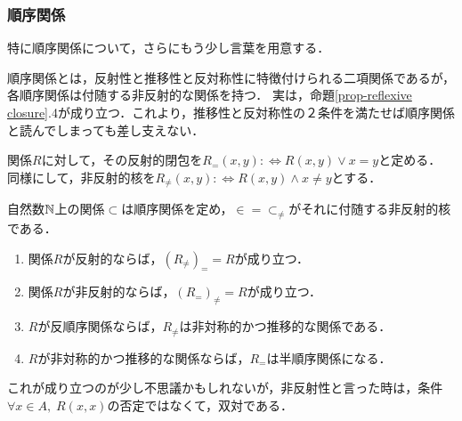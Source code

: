 \documentclass[uplatex, dvipdfmx]{jsreport}
\begin{document}
\subsubsection*{順序関係}

特に順序関係について，さらにもう少し言葉を用意する．

順序関係とは，反射性と推移性と反対称性に特徴付けられる二項関係であるが，各順序関係は付随する非反射的な関係を持つ．
実は，命題\ref{prop-reflexive closure}.4が成り立つ．これより，推移性と反対称性の２条件を満たせば順序関係と読んでしまっても差し支えない．
\begin{notation}
    関係$R$に対して，その反射的閉包を$R_=(x,y):\Leftrightarrow R(x,y)\lor x=y$と定める．
    同様にして，非反射的核を$R_\ne(x,y):\Leftrightarrow R(x,y)\land x\ne y$とする．
\end{notation}
\begin{example}
    自然数$\mathbb{N}$上の関係$\subset$は順序関係を定め，$\in=\subset_\ne$がそれに付随する非反射的核である．
\end{example}

\begin{proposition}\label{prop-reflexive closure}\mbox{}
    \begin{enumerate}
        \item 関係$R$が反射的ならば，$(R_\ne)_==R$が成り立つ．
        \item 関係$R$が非反射的ならば，$(R_=)_{\ne}=R$が成り立つ．
        \item $R$が反順序関係ならば，$R_{\ne}$は非対称的かつ推移的な関係である．
        \item $R$が非対称的かつ推移的な関係ならば，$R_=$は半順序関係になる．
    \end{enumerate}
\end{proposition}
\begin{remark}
    これが成り立つのが少し不思議かもしれないが，非反射性と言った時は，条件$\forall x\in A,\; R(x,x)$の否定ではなくて，双対である．
\end{remark}
\end{document}
